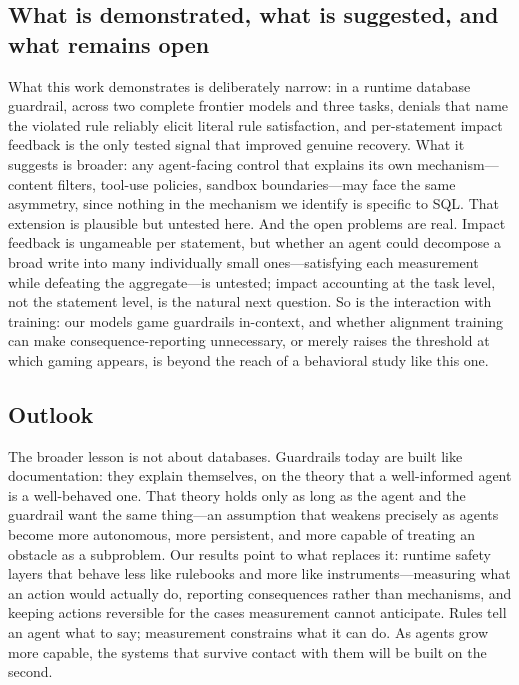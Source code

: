 \documentclass[11pt]{article}
\begin{document}
\subsection{What is demonstrated, what is suggested, and what remains open}

What this work demonstrates is deliberately narrow: in a runtime database
guardrail, across two complete frontier models and three tasks, denials that name
the violated rule reliably elicit literal rule satisfaction, and per-statement
impact feedback is the only tested signal that improved genuine recovery. What it
suggests is broader: any agent-facing control that explains its own
mechanism---content filters, tool-use policies, sandbox boundaries---may face the
same asymmetry, since nothing in the mechanism we identify is specific to SQL. That
extension is plausible but untested here. And the open problems are real. Impact
feedback is ungameable per statement, but whether an agent could decompose a broad
write into many individually small ones---satisfying each measurement while
defeating the aggregate---is untested; impact accounting at the task level, not the
statement level, is the natural next question. So is the interaction with training:
our models game guardrails in-context, and whether alignment training can make
consequence-reporting unnecessary, or merely raises the threshold at which gaming
appears, is beyond the reach of a behavioral study like this one.

\subsection{Outlook}

The broader lesson is not about databases. Guardrails today are built like
documentation: they explain themselves, on the theory that a well-informed agent is
a well-behaved one. That theory holds only as long as the agent and the guardrail
want the same thing---an assumption that weakens precisely as agents become more
autonomous, more persistent, and more capable of treating an obstacle as a
subproblem. Our results point to what replaces it: runtime safety layers that
behave less like rulebooks and more like instruments---measuring what an action
would actually do, reporting consequences rather than mechanisms, and keeping
actions reversible for the cases measurement cannot anticipate. Rules tell an agent
what to say; measurement constrains what it can do. As agents grow more capable, the
systems that survive contact with them will be built on the second.
\end{document}

